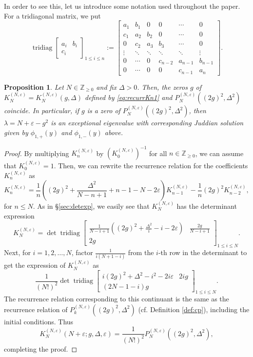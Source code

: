 \documentclass[11pt]{article}
\numberwithin{equation}{section}
\newcommand{\Z}{\mathbb{Z}} %
\newcommand{\e}{\varepsilon}
\newcommand{\cp}[2]{P^{(#1)}_{#2}} %
\DeclareMathOperator{\tridiag}{tridiag}
\newcommand{\Tridiag}[4]{\tridiag\mat{#1 & #2 \\ #3}_{#4}}
\newcommand{\mat}[1]{\begin{bmatrix}#1\end{bmatrix}}
\theoremstyle{plain}
\newtheorem{prop}[thm]{Proposition}
\theoremstyle{definition}
\theoremstyle{remark}
\begin{document}
In order to see this, let us introduce some notation used throughout the paper. For a tridiagonal matrix, we put
\begin{equation*}
  \Tridiag{a_i}{b_i}{c_i}{1\le i\le n}
  :=\begin{bmatrix}
    a_1 & b_1 & 0 &  0 & \cdots & 0    \\
    c_1 & a_2 & b_2 & 0 & \cdots  & 0\\
    0 & c_2 & a_3 & b_3 &  \cdots & 0 \\
    \vdots & \ddots   & \ddots & \ddots & \ddots & \vdots   \\
    0 &  \cdots &  0 & c_{n-2} & a_{n-1} & b_{n-1} \\
    0 & \cdots  & 0 & 0 & c_{n-1} & a_n
  \end{bmatrix}.
\end{equation*}

\begin{prop}\label{Prop:reccurEquiv}
  Let \(N \in \Z_{\geq 0}\) and fix \(\Delta> 0\).   Then, the zeros \(g\) of \(K^{(N,\e)}_N = K_N^{(N,\e)}(g,\Delta)\) defined by
  \eqref{eq:recurrKn1} and \( P_N^{(N,\e)}((2g)^2,\Delta^2)\) coincide.
  In particular, if \(g\) is a zero of \(\cp{N,\e}{N}((2g)^2,\Delta^2)\), then \( \lambda = N  + \e - g^2\) is an exceptional eigenvalue with
  corresponding Juddian solution given by \(\phi_{1,+}(y)\) and \(\phi_{1,-}(y)\) above.
\end{prop}

\begin{proof}
  By multiplying \(K_n^{(N,\e)}\) by \((K_0^{(N,\e)})^{-1} \) for all \(n \in \Z_{\geq 0}\), we can assume that \(K_0^{(N,\e)} = 1 \).
  Then, we can rewrite the recurrence relation for the coefficients \(K_n^{(N,\e)}\) as
  \begin{equation*}
    K_{n}^{(N,\e)} = \frac{1}{n} \left( (2g)^2 + \frac{\Delta^2}{N-n+1} + n-1 - N - 2\e \right)K_{n-1}^{(N,\e)}
    - \frac{1}{n} (2g)^2 K_{n-2}^{(N,\e)},
  \end{equation*}
  for \(n \leq N\). As in \S \ref{sec:detexp}, we easily see that \(K_N^{(N,\e)}\) has the determinant expression
  \begin{equation*}
    K^{(N,\e)}_N=\det\Tridiag{\frac1{N-i+1}((2g)^2+\frac{\Delta^2}i-i-2\e)}{\frac{2g}{N-i+1}}{2g}{1\le i\le N}.
  \end{equation*}
  Next, for \(i=1,2,\ldots,N \), factor \(\frac{1}{i(N+1-i)}\) from the \(i\)-th row in the
  determinant to get the expression of $K^{(N,\e)}_N$ as
  \begin{equation*}
    \frac1{(N!)^2}\det\Tridiag{i(2g)^2+\Delta^2-i^2-2i\e}{2ig}{(2N-1-i)g}{1\le i\le N}.
  \end{equation*}
  The recurrence relation corresponding to this continuant is the same as the recurrence relation of \(\cp{N,\e}{k}((2g)^2,\Delta^2)\) (cf. Definition \ref{def:cp}), including the initial conditions.
  Thus
  \[
    K_N^{(N,\e)}(N+\e;g,\Delta,\e) = \frac{1}{(N!)^2}\cp{N,\e}{N}((2g)^2,\Delta^2),
  \]
  completing the proof. 
\end{proof}
\end{document}

